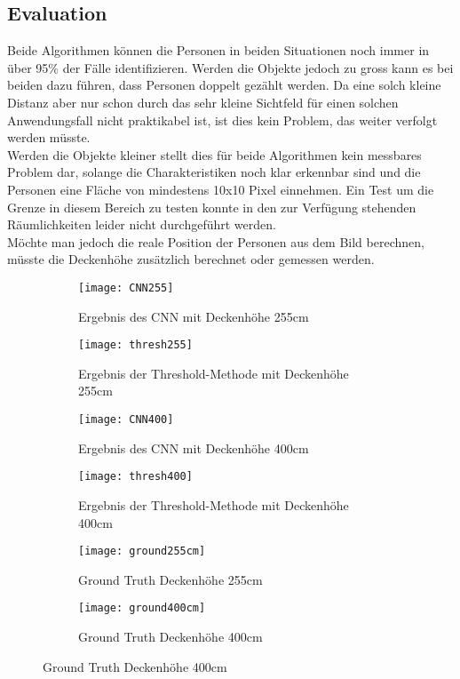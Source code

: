 \subsection{Evaluation}
Beide Algorithmen können die Personen in beiden Situationen noch immer in über 95\% der Fälle identifizieren. Werden die Objekte jedoch zu gross kann es bei beiden dazu führen, dass Personen doppelt gezählt werden. Da eine solch kleine Distanz aber nur schon durch das sehr kleine Sichtfeld für einen solchen Anwendungsfall nicht praktikabel ist, ist dies kein Problem, das weiter verfolgt werden müsste.\\
Werden die Objekte kleiner stellt dies für beide Algorithmen kein messbares Problem dar, solange die Charakteristiken noch klar erkennbar sind und die Personen eine Fläche von mindestens 10x10 Pixel einnehmen. Ein Test um die Grenze in diesem Bereich zu testen konnte in den zur Verfügung stehenden Räumlichkeiten leider nicht durchgeführt werden.\\
Möchte man jedoch die reale Position der Personen aus dem Bild berechnen, müsste die Deckenhöhe zusätzlich berechnet oder gemessen werden.

\begin{figure}[H]
	\begin{subfigure}{.45\linewidth}
		\centering
		\texttt{[image: CNN255]}
		\caption{Ergebnis des CNN mit Deckenhöhe 255cm}
		\label{fig:cnn255}
	\end{subfigure}\hfill%
	\begin{subfigure}{.45\linewidth}
		\centering
		\texttt{[image: thresh255]}
		\caption{Ergebnis der Threshold-Methode mit Deckenhöhe 255cm}
		\label{fig:thresh255}
	\end{subfigure}\hfill%
	\begin{subfigure}{.45\linewidth}
		\centering
		\texttt{[image: CNN400]}
		\caption{Ergebnis des CNN mit Deckenhöhe 400cm}
		\label{fig:cnn400}
	\end{subfigure}\hfill%
	\begin{subfigure}{.45\linewidth}
		\centering
		\texttt{[image: thresh400]}
		\caption{Ergebnis der Threshold-Methode mit Deckenhöhe 400cm}
		\label{fig:thresh400}
	\end{subfigure}\hfill%
	\begin{subfigure}{.45\linewidth}
		\centering
		\texttt{[image: ground255cm]}
		\caption{Ground Truth Deckenhöhe 255cm}
		\label{fig:ground255}
	\end{subfigure}\hfill%
	\begin{subfigure}{.45\linewidth}
		\centering
		\texttt{[image: ground400cm]}
		\caption{Ground Truth Deckenhöhe 400cm}
		\label{fig:ground400}
	\end{subfigure}
\end{figure}


